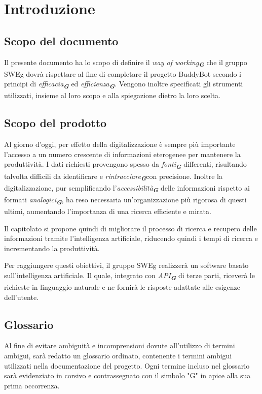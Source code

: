 


\section{Introduzione}
\label{sec:introduzione}

\subsection{Scopo del documento}
Il presente documento ha lo scopo di definire il \emph{way of working}\textsubscript{\textit{\textbf{G}}} che il gruppo SWEg dovrà rispettare al fine di completare il progetto BuddyBot secondo i principi di \emph{efficacia}\textsubscript{\textit{\textbf{G}}} ed \emph{efficienza}\textsubscript{\textit{\textbf{G}}}.
Vengono inoltre specificati gli strumenti utilizzati, insieme al loro scopo e alla spiegazione dietro la loro scelta.
\subsection{Scopo del prodotto}
Al giorno d'oggi, per effetto della digitalizzazione è sempre più importante l'accesso a un numero crescente di informazioni eterogenee per mantenere la produttività. I dati richiesti provengono spesso da  \emph{fonti}\textsubscript{\textit{\textbf{G}}} differenti, risultando talvolta difficili da identificare e  \emph{rintracciare}\textsubscript{\textit{\textbf{G}}}con precisione. Inoltre la digitalizzazione, pur semplificando l'\emph{accessibilità}\textsubscript{\textit{\textbf{G}}} delle informazioni rispetto ai formati  \emph{analogici}\textsubscript{\textit{\textbf{G}}}, ha reso necessaria un'organizzazione più rigorosa di questi ultimi, aumentando l'importanza di una ricerca efficiente e mirata.

Il capitolato si propone quindi di migliorare il processo di ricerca e recupero delle informazioni tramite l'intelligenza artificiale, riducendo quindi i tempi di ricerca e incrementando la produttività.

Per raggiungere questi obiettivi, il gruppo SWEg realizzerà un software basato sull'intelligenza artificiale. Il quale, integrato con \emph{API}\textsubscript{\textit{\textbf{G}}} di terze parti, riceverà le richieste in linguaggio naturale e ne fornirà le risposte adattate alle esigenze dell'utente.
\subsection{Glossario}
Al fine di evitare ambiguità e incomprensioni dovute all'utilizzo di termini ambigui, sarà redatto un glossario ordinato, contenente i termini ambigui utilizzati nella documentazione del progetto. Ogni termine incluso nel glossario sarà evidenziato in corsivo e contrassegnato con il simbolo "G" in apice alla sua prima occorrenza.

